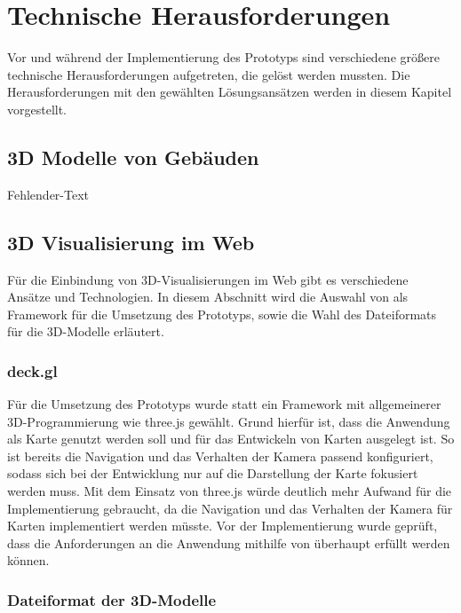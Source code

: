\newpage
\section{Technische Herausforderungen}
Vor und während der Implementierung des Prototyps sind verschiedene größere technische Herausforderungen aufgetreten, die gelöst werden mussten. Die Herausforderungen mit den gewählten Lösungsansätzen werden in diesem Kapitel vorgestellt. 

\subsection{3D Modelle von Gebäuden}
Fehlender-Text

\subsection{3D Visualisierung im Web}
Für die Einbindung von 3D-Visualisierungen im Web gibt es verschiedene Ansätze und Technologien. In diesem Abschnitt wird die Auswahl von \deckgl{} als Framework für die Umsetzung des Prototyps, sowie die Wahl des Dateiformats für die 3D-Modelle erläutert.

\subsubsection{deck.gl}
Für die Umsetzung des Prototyps wurde \deckgl{} statt ein Framework mit allgemeinerer 3D-Programmierung wie three.js gewählt. Grund hierfür ist, dass die Anwendung als Karte genutzt werden soll und \deckgl{} für das Entwickeln von Karten ausgelegt ist. So ist bereits die Navigation und das Verhalten der Kamera passend konfiguriert, sodass sich bei der Entwicklung nur auf die Darstellung der Karte fokusiert werden muss. Mit dem Einsatz von three.js würde deutlich mehr Aufwand für die Implementierung gebraucht, da die Navigation und das Verhalten der Kamera für Karten implementiert werden müsste. Vor der Implementierung wurde geprüft, dass die Anforderungen an die Anwendung mithilfe von \deckgl{} überhaupt erfüllt werden können.

\subsubsection{Dateiformat der 3D-Modelle}\label{sec:ModelFileFormat}

